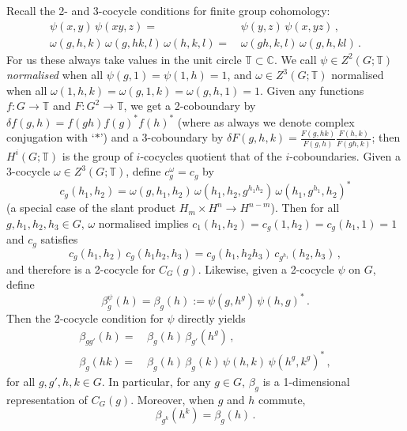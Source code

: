\documentclass[12pt]{article}
\numberwithin{equation}{section}
\def\bbC           {\mathbb{C}}
\def\bbT           {\mathbb{T}}
\begin{document}
Recall the 2- and 3-cocycle conditions for finite group cohomology:
\begin{align}\label{2coc}\psi(x,y)\,\psi(xy,z)=&\,\psi(y,z)\,\psi(x,yz)\,,\\
\label{3coc}\omega(g,h,k)\,\omega(g,hk,l)\,\omega(h,k,l)=&\,\omega(gh,k,l)\,\omega(g,h,kl)\,.\end{align}
For us these always  take values in the unit circle $\bbT\subset\bbC$. We call $\psi\in Z^2(G;\bbT)$  \textit{normalised} when all $\psi(g,1)=\psi(1,h)=1$, and  $\omega\in Z^3(G;\bbT)$  normalised when
all $\omega(1,h,k)=\omega(g,1,k)=\omega(g,h,1)=1$. Given any functions
$f:G\rightarrow \bbT$ and $F:G^2\rightarrow\bbT$, we get a 2-coboundary by ${\delta f}(g,h)=f(gh){f(g)^*}{f(h)^*}$ 
{(where as always we denote complex conjugation with `$*$')} and a 3-coboundary by ${\delta F}(g,h,k)=\frac{F(g,hk)}{F(g,h)}\frac{F(h,k)}{F(gh,k)}$; then {$H^i(G;\bbT)$ is the group of $i$-cocycles quotient that of the $i$-coboundaries.} 
Given a 3-cocycle $\omega\in Z^3(G;\bbT)$, define  $c^\omega_g=c_g$ by
\begin{equation} \label{2cocycle}c_g(h_1,h_2)={\omega(g,h_1,h_2)}\,{\omega(h_1,h_2,g^{h_1h_2})}\,\omega(h_1,g^{h_1},h_2)^*\end{equation}
(a special case of the slant product $H_m\times H^n\rightarrow H^{n-m}$).
Then {for all $g,h_1,h_2,h_3\in G$,} {$\omega$ normalised implies $c_1(h_1,h_2)=c_g(1,h_2)=c_g(h_1,1)=1$} and $c_g$ satisfies \cite{Bnt}
\begin{equation}\label{twcoc} c_g(h_1,h_2)\,c_g(h_1h_2,h_3)=c_g(h_1,h_2h_3)\,c_{g^{h_1}}(h_2,h_3)\,,\end{equation}
and therefore is a 2-cocycle for $C_G(g)$. Likewise, given a 2-cocycle $\psi$ on  $G$, define
 \begin{equation}\label{betag}\beta^\psi_g(h)=\beta_g(h):=\psi(g,h^g)\,{{\psi(h,g)^*}}\,.\end{equation}
  Then the 2-cocycle condition for $\psi$ directly yields
 \begin{align}\beta_{gg'}(h)=&\,\beta_g(h)\,\beta_{g'}(h^g)\,,\label{bichar}\\
 \beta_g(hk)=&\,\beta_g(h)\,\beta_g(k)\,\psi(h,k)\,{{\psi(h^g,k^g)^*}}\,,\label{bichar2} \end{align}
for all $g,g',h,k\in G$. In particular, for any $g\in G$, $\beta_g$ is a 1-dimensional representation of $C_G(g)$. Moreover,
when $g$ and $h$ commute, 
\begin{equation}
\beta_{g^k}(h^k)=\beta_g(h)\,.\label{conjprop}\end{equation}
\end{document}
